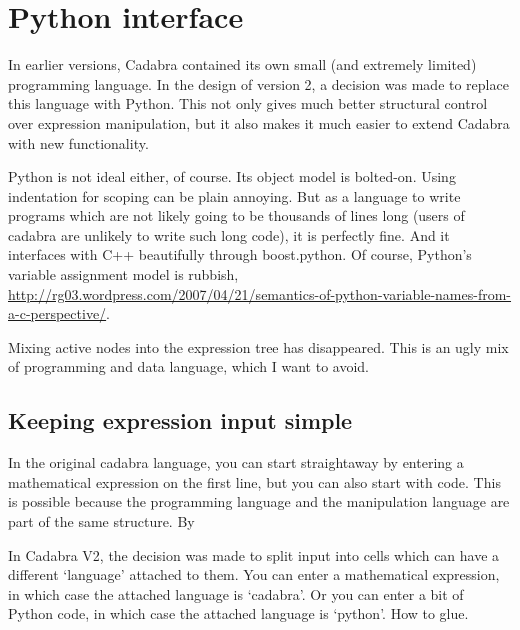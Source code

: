\documentclass[11pt]{article}
\begin{document}

%

\section{Python interface}

In earlier versions, Cadabra contained its own small (and extremely
limited) programming language. In the design of version 2, a decision
was made to replace this language with Python. This not only gives
much better structural control over expression manipulation, but it
also makes it much easier to extend Cadabra with new functionality.

Python is not ideal either, of course. Its object model is bolted-on.
Using indentation for scoping can be plain annoying.  But as a
language to write programs which are not likely going to be thousands
of lines long (users of cadabra are unlikely to write such long code),
it is perfectly fine. And it interfaces with C++ beautifully through
boost.python. Of course, Python's variable assignment model is
rubbish,
\url{http://rg03.wordpress.com/2007/04/21/semantics-of-python-variable-names-from-a-c-perspective/}.

Mixing active nodes into the expression tree has disappeared. This is
an ugly mix of programming and data language, which I want to avoid.


\subsection{Keeping expression input simple}

In the original cadabra language, you can start straightaway by
entering a mathematical expression on the first line, but you can also
start with code.  This is possible because the programming language
and the manipulation language are part of the same structure. By

In Cadabra V2, the decision was made to split input into cells which
can have a different `language' attached to them. You can enter a
mathematical expression, in which case the attached language is
`cadabra'. Or you can enter a bit of Python code, in which case the
attached language is `python'. How to glue.
\end{document}
